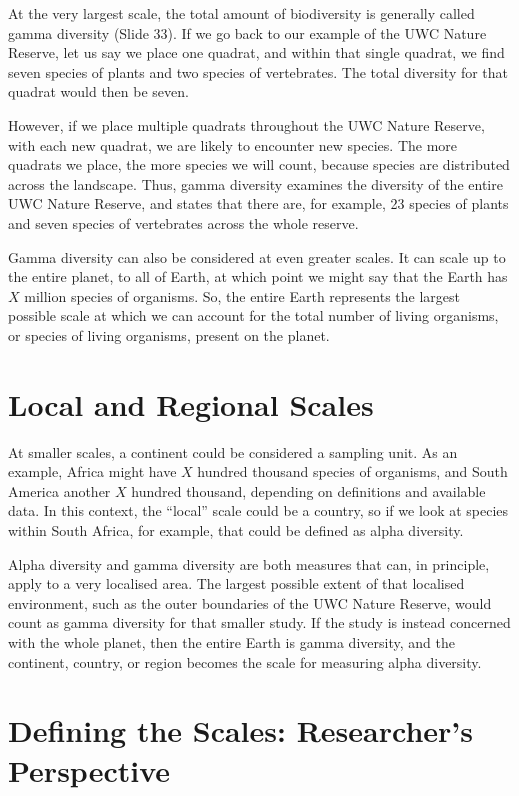 \documentclass[
  11pt,
]{book}
\begin{document}
At the very largest scale, the total amount of biodiversity is generally
called gamma diversity (Slide 33). If we go back to our example of the
UWC Nature Reserve, let us say we place one quadrat, and within that
single quadrat, we find seven species of plants and two species of
vertebrates. The total diversity for that quadrat would then be seven.

However, if we place multiple quadrats throughout the UWC Nature
Reserve, with each new quadrat, we are likely to encounter new species.
The more quadrats we place, the more species we will count, because
species are distributed across the landscape. Thus, gamma diversity
examines the diversity of the entire UWC Nature Reserve, and states that
there are, for example, 23 species of plants and seven species of
vertebrates across the whole reserve.

Gamma diversity can also be considered at even greater scales. It can
scale up to the entire planet, to all of Earth, at which point we might
say that the Earth has \(X\) million species of organisms. So, the
entire Earth represents the largest possible scale at which we can
account for the total number of living organisms, or species of living
organisms, present on the planet.

\section{Local and Regional Scales}\label{local-and-regional-scales}

At smaller scales, a continent could be considered a sampling unit. As
an example, Africa might have \(X\) hundred thousand species of
organisms, and South America another \(X\) hundred thousand, depending
on definitions and available data. In this context, the ``local'' scale
could be a country, so if we look at species within South Africa, for
example, that could be defined as alpha diversity.

Alpha diversity and gamma diversity are both measures that can, in
principle, apply to a very localised area. The largest possible extent
of that localised environment, such as the outer boundaries of the UWC
Nature Reserve, would count as gamma diversity for that smaller study.
If the study is instead concerned with the whole planet, then the entire
Earth is gamma diversity, and the continent, country, or region becomes
the scale for measuring alpha diversity.

\section{Defining the Scales: Researcher's
Perspective}\label{defining-the-scales-researchers-perspective}
\end{document}
